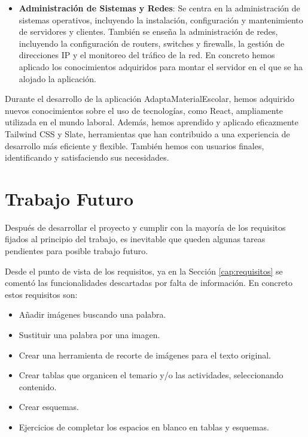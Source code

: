 \begin{itemize}
    \item \textbf{Administración de Sistemas y Redes}: Se centra en la administración de sistemas operativos, incluyendo la instalación, configuración y mantenimiento de servidores y clientes. También se enseña la administración de redes, incluyendo la configuración de routers, switches y firewalls, la gestión de direcciones IP y el monitoreo del tráfico de la red. En concreto hemos aplicado los conocimientos adquiridos para montar el servidor en el que se ha alojado la aplicación.
\end{itemize}

Durante el desarrollo de la aplicación AdaptaMaterialEscolar, hemos adquirido nuevos conocimientos sobre el uso de tecnologías, como React, ampliamente utilizada en el mundo laboral. Además, hemos aprendido y aplicado eficazmente Tailwind CSS y Slate, herramientas que han contribuido a una experiencia de desarrollo más eficiente y flexible. También hemos con usuarios finales, identificando y satisfaciendo sus necesidades.

\section{Trabajo Futuro}
\label{sec:TrabajoFuturo}
Después de desarrollar el proyecto y cumplir con la mayoría de los requisitos fijados al principio del trabajo, es inevitable que queden algunas tareas pendientes para posible trabajo futuro.

Desde el punto de vista de los requisitos, ya en la Sección \ref{cap:requisitos} se comentó las funcionalidades descartadas por falta de información. En concreto estos requisitos son:
\begin{itemize}
    \item Añadir imágenes buscando una palabra.
    \item Sustituir una palabra por una imagen.
    \item Crear una herramienta de recorte de imágenes para el texto original.
    \item Crear tablas que organicen el temario y/o las actividades, seleccionando contenido.
    \item Crear esquemas.
    \item Ejercicios de completar los espacios en blanco en tablas y esquemas.
\end{itemize}


